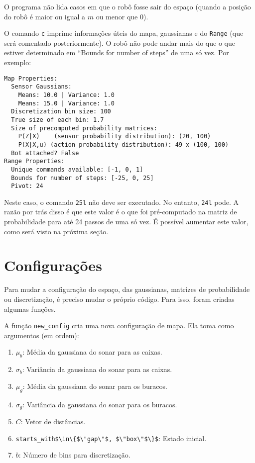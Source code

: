 \documentclass[12pt]{article}
\theoremstyle{plain}
\numberwithin{equation}{section}
\newcommand{\code}[1]{\lstinline[mathescape=true]{#1}}
\newcommand{\mcode}[1]{\lstinline[mathescape]!#1!}
\begin{document}
O programa não lida casos em que o robô fosse sair do espaço (quando a posição do robô é maior ou
igual a $m$ ou menor que 0).

O comando \code{c} imprime informações úteis do mapa, gaussianas e do \code{Range} (que será
comentado posteriormente). O robô não pode andar mais do que o que estiver determinado em ``Bounds
for number of steps'' de uma só vez. Por exemplo:

\begin{lstlisting}
Map Properties:
  Sensor Gaussians:
    Means: 10.0 | Variance: 1.0
    Means: 15.0 | Variance: 1.0
  Discretization bin size: 100
  True size of each bin: 1.7
  Size of precomputed probability matrices:
    P(Z|X)    (sensor probability distribution): (20, 100)
    P(X|X,u) (action probability distribution): 49 x (100, 100)
  Bot attached? False
Range Properties:
  Unique commands available: [-1, 0, 1]
  Bounds for number of steps: [-25, 0, 25]
  Pivot: 24
\end{lstlisting}

Neste caso, o comando \code{25l} não deve ser executado. No entanto, \code{24l} pode. A razão por
trás disso é que este valor é o que foi pré-computado na matriz de probabilidade para até 24 passos
de uma só vez. É possível aumentar este valor, como será visto na próxima seção.

\section{Configurações}

Para mudar a configuração do espaço, das gaussianas, matrizes de probabilidade ou discretização, é
preciso mudar o próprio código. Para isso, foram criadas algumas funções.

A função \code{new_config} cria uma nova configuração de mapa. Ela toma como argumentos (em ordem):

\begin{enumerate}
  \item $\mu_b$: Média da gaussiana do sonar para as caixas.
  \item $\sigma_b$: Variância da gaussiana do sonar para as caixas.
  \item $\mu_g$: Média da gaussiana do sonar para os buracos.
  \item $\sigma_g$: Variância da gaussiana do sonar para os buracos.
  \item $C$: Vetor de distâncias.
  \item \mcode{starts_with$\in\{$\"gap\"$, $\"box\"$\}$}: Estado inicial.
  \item $b$: Número de bins para discretização.
\end{enumerate}
\end{document}
